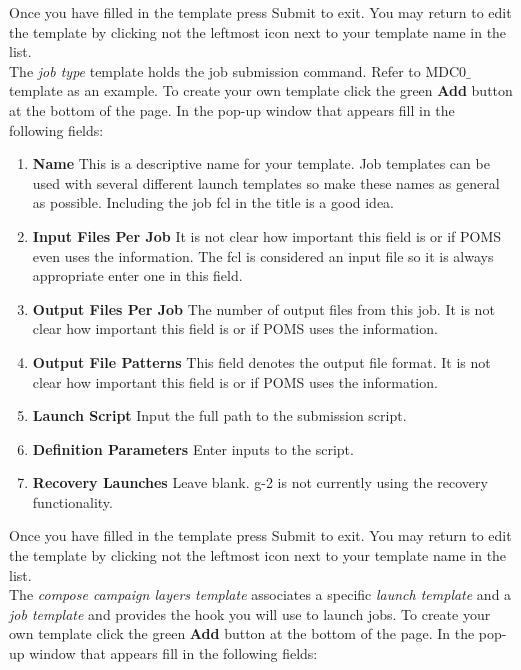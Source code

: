 \noindent Once you have filled in the template press Submit to exit. You may return to edit the template by clicking not the leftmost icon next to your template name in the list.\\


\noindent  The {\it job type} template holds the job submission command. Refer to MDC0$\_$template as an example. To create your own template click the green {\bf Add} button at the bottom of the page. In the pop-up window that appears fill in the following fields:

\begin{enumerate}
\item[]{\bf{Name}} This is a descriptive name for your template.  Job templates can be used with several different launch templates so make these names as general as possible.  Including the job fcl in the title is a good idea.
\item[]{\bf{Input Files Per Job}}  It is not clear how important this field is or if POMS even uses the information. The fcl is considered an input file so it is always appropriate enter one in this field. 
\item[]{\bf{Output Files Per Job}} The number of output files from this job. It is not clear how important this field is or if POMS uses the information.
\item[]{\bf{Output File Patterns}} This field denotes the output file format. It is not clear how important this field is or if POMS uses the information.
\item[]{\bf{Launch Script}} Input the full path to the submission script. 
\item[]{\bf{Definition Parameters}} Enter inputs to the script.
\item[]{\bf{Recovery Launches}} Leave blank. g-2 is not currently using the recovery functionality.
\end{enumerate}

\noindent Once you have filled in the template press Submit to exit. You may return to edit the template by clicking not the leftmost icon next to your template name in the list.\\

\noindent The {\it {compose campaign layers template}}  associates a specific {\it {launch template}} and a  {\it {job template}} and provides the hook you will use to launch jobs. To create your own template click the green {\bf Add} button at the bottom of the page. In the pop-up window that appears fill in the following fields:

